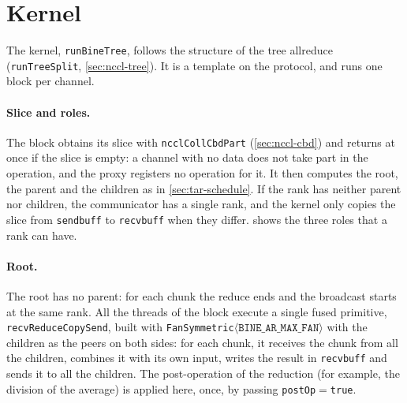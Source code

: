 \section{Kernel}\label{sec:tar-kernel}
The kernel, \texttt{runBineTree}, follows the structure of the \nccl{} tree allreduce (\texttt{runTreeSplit}, \cref{sec:nccl-tree}).
It is a template on the protocol, and runs one block per channel.
\paragraph{Slice and roles.}
The block obtains its slice with \texttt{ncclCollCbdPart} (\cref{sec:nccl-cbd}) and returns at once if the slice is empty: a channel with no data does not take part in the operation, and the proxy registers no operation for it.
It then computes the root, the parent and the children as in \cref{sec:tar-schedule}.
If the rank has neither parent nor children, the communicator has a single rank, and the kernel only copies the slice from \texttt{sendbuff} to \texttt{recvbuff} when they differ.
 shows the three roles that a rank can have.
\paragraph{Root.}
The root has no parent: for each chunk the reduce ends and the broadcast starts at the same rank.
All the threads of the block execute a single fused primitive, \texttt{recvReduceCopySend}, built with \texttt{FanSymmetric}$\langle\texttt{BINE\_AR\_MAX\_FAN}\rangle$ with the children as the peers on both sides: for each chunk, it receives the chunk from all the children, combines it with its own input, writes the result in \texttt{recvbuff} and sends it to all the children.
The post-operation of the reduction (for example, the division of the average) is applied here, once, by passing \texttt{postOp}$=$\texttt{true}.
